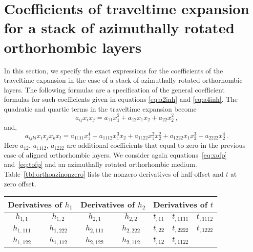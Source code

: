 \section{Coefficients of traveltime expansion for a stack of azimuthally rotated orthorhombic layers}
In this section,  we specify the exact expressions for the coefficients of the traveltime expansion in the case of a stack of azimuthally rotated orthorhombic layers. The following formulas are a specification of the general coefficient formulas for such coefficients given in equations \ref{eq:a2inh} and \ref{eq:a4inh}. The quadratic and quartic terms in the traveltime expansion become 
\begin{equation}
\label{eq:nmoazi}
a_{ij} x_i x_j = a_{11}x^2_1 + a_{12}x_1 x_2 + a_{22}x^2_2 ~,
\end{equation}
and,
\begin{equation}
\label{eq:quarticazi}
a_{ijkl} x_i x_j x_k x_l = a_{1111} x^4_1 + a_{1112} x^3_1 x_2 + a_{1122} x^2_1 x^2_2 + a_{1222} x_1 x^3_2 + a_{2222} x^4_2~.
\end{equation}
Here $a_{12}$, $a_{1112}$, $a_{1222}$ are additional coefficients that  equal to zero in the previous case of aligned orthorhombic layers. We consider again equations~\ref{eq:xofp} and~\ref{eq:tofp} and an azimuthally rotated orthorhombic medium. Table~\ref{tbl:orthoazinonzero} lists the nonzero derivatives of half-offset  and  $t$ at  zero offset.

{
\centering
     	     \begin{tabular}{|c c | c c | c c c|}
     	     \hline \multicolumn{2}{|c|}{Derivatives of $h_1$} & \multicolumn{2}{|c|}{Derivatives of $h_2$}  &\multicolumn{3}{|c|}{Derivatives of $t$} \\ 
            \hline $h_{1,1} $ & $h_{1,2} $ & $h_{2,1} $ & $h_{2,2}  $ & $t_{,11} $  & $t_{,1111} $ & $t_{,1112} $\\ 
            $h_{1,111} $ & $h_{1,222} $ & $h_{2,111} $ & $h_{2,222} $ & $t_{,22} $  & $t_{,2222} $ & $t_{,1222} $\\ 
            $h_{1,122} $ & $h_{1,112} $ & $h_{2,122} $ & $h_{2,112} $ & $t_{,12} $  & $t_{,1122} $ &\\ 
            \hline
    \end{tabular}
}

